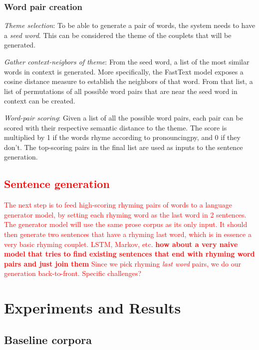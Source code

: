 \documentclass[11pt,a4paper]{article}
\newenvironment{tight_enumerate}{
\begin{enumerate}
\setlength{\itemsep}{0pt}
\setlength{\parskip}{0pt}
}{\end{enumerate}}
\begin{document}
\subsubsection{Word pair creation}
\begin{tight_enumerate}
	\item \textit{Theme selection}: To be able to generate a pair of words, the system needs to have a \textit{seed word}. This can be considered the theme of the couplets that will be generated.
	\item \textit{Gather context-neigbors of theme}: From the seed word, a list of the most similar words in context is generated. More specifically, the FastText model exposes a cosine distance measure to establish the neighbors of that word. From that list, a list of permutations of all possible word pairs that are near the seed word in context can be created.
	\item \textit{Word-pair scoring}: Given a list of all the possible word pairs, each pair can be scored with their respective semantic distance to the theme. The score is multiplied by 1 if the words rhyme according to pronouncingpy, and 0 if they don't. The top-scoring pairs in the final list are used as inputs to the sentence generation.
\end{tight_enumerate}

\textcolor{red}{
\subsection{Sentence generation}
\label{sec:languagegen}
The next step is to feed high-scoring rhyming pairs of words to a language generator model, by setting each rhyming word as the last word in 2 sentences. The generator model will use the same prose corpus as its only input. It should then generate two sentences that have a rhyming last word, which is in essence a very basic rhyming couplet.
LSTM, Markov, etc.
\textbf{how about a very naive model that tries to find existing sentences that end with rhyming word pairs and just join them}
Since we pick rhyming \textit{last word} pairs, we do our generation back-to-front. Specific challenges?
}

\section{Experiments and Results}
\label{sec:results}

\subsection{Baseline corpora}
\label{sec:corpora}
\end{document}
